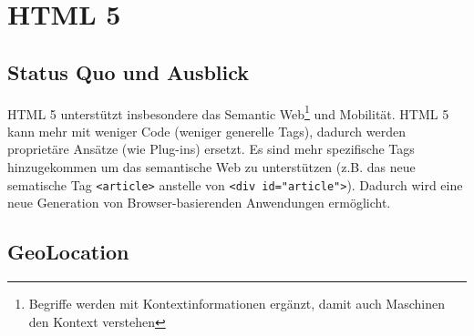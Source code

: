 \chapter{HTML 5}

\section{Status Quo und Ausblick}

HTML 5 unterstützt insbesondere das Semantic Web\footnote{Begriffe werden mit Kontextinformationen ergänzt, damit auch Maschinen den Kontext verstehen} und Mobilität. HTML 5 kann mehr mit weniger Code (weniger generelle Tags), dadurch werden proprietäre Ansätze (wie Plug-ins) ersetzt. Es sind mehr spezifische Tags hinzugekommen um das semantische Web zu unterstützen (z.B. das neue sematische Tag \verb|<article>| anstelle von \verb|<div id="article">|). Dadurch wird eine neue Generation von Browser-basierenden Anwendungen ermöglicht.

\section{GeoLocation}

